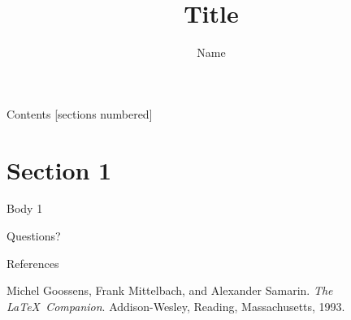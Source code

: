 \documentclass[aspectratio=169,11pt]{beamer}
\author{Name}
\title{Title}
\subtitle{}
\numberwithin{equation}{section} %
\begin{document}
\maketitle

\begin{frame}{Contents}
    [sections numbered]
    \tableofcontents[hideallsubsections]

\end{frame}

\section{Section 1}

\begin{frame}{Body 1}

    \note{\footnotesize{

    }}
\end{frame}


\begin{frame}[standout]
  Questions?
\end{frame}

\begin{frame}{References}
    \nocite{...}  %

    \begin{thebibliography}{9}

    

    Michel Goossens, Frank Mittelbach, and Alexander Samarin.
    \textit{The \LaTeX\ Companion}.
    Addison-Wesley, Reading, Massachusetts, 1993.


    \end{thebibliography}
\end{frame}
\end{document}
